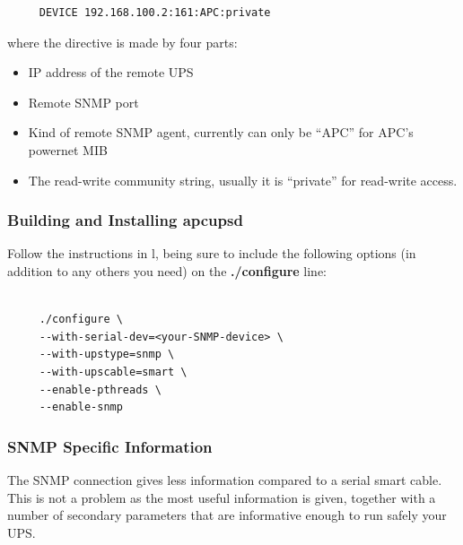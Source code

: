 {{{{{{{{{{\begin{verbatim}
     DEVICE 192.168.100.2:161:APC:private
\end{verbatim}
\normalsize

where the directive is made by four parts:  

\begin{itemize}
\item IP address of the remote UPS  
\item Remote SNMP port  
\item Kind of remote SNMP agent, currently can only be ``APC'' for APC's
powernet MIB  
\item The read-write community string, usually it is ``private'' for
read-write access. 
\end{itemize}

\label{Building-and-Installing-apcupsd-_003c1_003e}

\subsubsection*{Building and Installing apcupsd}

Follow the instructions in 
l, being sure to include
the following options (in addition to any others you need) on the {\bf
./configure} line: 

\footnotesize
\begin{verbatim}
     
     ./configure \
     --with-serial-dev=<your-SNMP-device> \
     --with-upstype=snmp \
     --with-upscable=smart \
     --enable-pthreads \
     --enable-snmp
\end{verbatim}
\normalsize

\label{SNMP-Specific-Information}

\subsubsection*{SNMP Specific Information}

\label{index-SNMP-164}
The SNMP connection gives less information compared to a serial smart cable.
This is not a problem as the most useful information is given, together with a
number of secondary parameters that are informative enough to run safely your
UPS. 

}}}}}}}}}}
